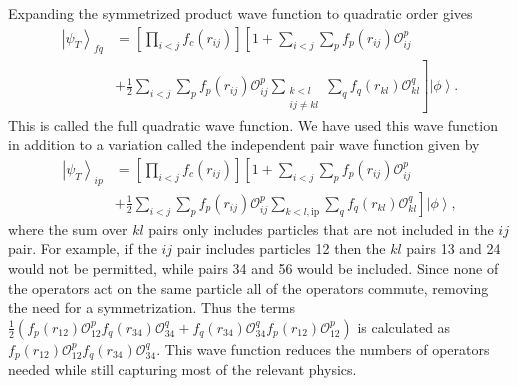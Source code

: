 \documentclass[aps,prl,reprint,superscriptaddress]{revtex4-1}
\newcommand{\ket}[1]{\left| #1 \right>}
\newcommand{\fpij}{f_p(r_{ij})}
\newcommand{\Opij}{\mathcal{O}_{ij}^p}
\newcommand{\fOpij}{\sum\limits_{i<j}\sum\limits_p \fpij\Opij}
\newcommand{\fqkl}{f_q(r_{kl})}
\newcommand{\Oqkl}{\mathcal{O}_{kl}^q}
\newcommand{\fOqklip}{\sum\limits_{k<l,\mathrm{ip}}\sum\limits_q \fqkl\Oqkl}
\newcommand{\fOqklquad}{\sum_{\substack{k<l\\ij \ne kl}}\sum\limits_q \fqkl\Oqkl}
\begin{document}
Expanding the symmetrized product wave function to quadratic order gives
\begin{equation}
\begin{split}
   \ket{\psi_T}_{fq} &= \left[\prod\limits_{i<j}f_c(r_{ij})\right] \left[1+\fOpij\right. \\
      & + \left.\frac{1}{2}\fOpij\fOqklquad \right] \ket{\phi}.
\end{split}
\end{equation}
This is called the full quadratic wave function. We have used this wave function in addition to a variation called the independent pair wave function given by
\begin{equation}
\begin{split}
   \ket{\psi_T}_{ip} &= \left[\prod\limits_{i<j}f_c(r_{ij})\right] \left[1+\fOpij\right. \\
   & + \left.\frac{1}{2}\fOpij\fOqklip \right] \ket{\phi},
\end{split}
\end{equation}
where the sum over $kl$ pairs only includes particles that are not included in the $ij$ pair. For example, if the $ij$ pair includes particles 12 then the $kl$ pairs 13 and 24 would not be permitted, while pairs 34 and 56 would be included. Since none of the operators act on the same particle all of the operators commute, removing the need for a symmetrization. Thus the terms $\frac{1}{2}(f_p(r_{12})\mathcal{O}^p_{12}f_q(r_{34})\mathcal{O}^q_{34}+f_q(r_{34})\mathcal{O}^q_{34}f_p(r_{12})\mathcal{O}^p_{12})$ is calculated as $f_p(r_{12})\mathcal{O}^p_{12}f_q(r_{34})\mathcal{O}^q_{34}$. This wave function reduces the numbers of operators needed while still capturing most of the relevant physics.
\end{document}
